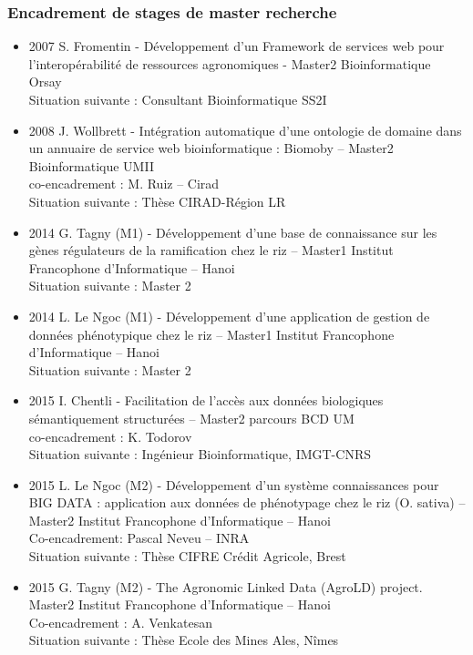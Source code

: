 
\subsubsection*{Encadrement de stages de master recherche}

\begin{itemize}
\item 2007 S. Fromentin - Développement d’un Framework de services web pour l’interopérabilité de ressources agronomiques - Master2 Bioinformatique Orsay\\
Situation suivante : Consultant Bioinformatique SS2I

\item 2008 J. Wollbrett - Intégration automatique d’une ontologie de domaine dans un annuaire de service web bioinformatique : Biomoby – Master2 Bioinformatique UMII\\
co-encadrement : M. Ruiz – Cirad\\
Situation suivante : Thèse CIRAD-Région LR

\item 2014 G. Tagny (M1) - Développement d’une base de connaissance sur les gènes régulateurs de la ramification chez le riz – Master1 Institut Francophone d’Informatique – Hanoi \\
Situation suivante : Master 2

\item 2014 L. Le Ngoc (M1) - Développement d’une application de gestion de données phénotypique chez le riz – Master1 Institut Francophone d’Informatique – Hanoi \\
Situation suivante : Master 2

\item 2015 I. Chentli - Facilitation de l'accès aux données biologiques sémantiquement structurées – Master2 parcours BCD UM \\
co-encadrement : K. Todorov \\
Situation suivante : Ingénieur Bioinformatique, IMGT-CNRS

\item 2015 L. Le Ngoc (M2) - Développement d’un système connaissances pour BIG DATA : application aux données de phénotypage chez le riz (O. sativa) – Master2 Institut Francophone d’Informatique – Hanoi \\
Co-encadrement: 	Pascal Neveu – INRA \\
Situation suivante : Thèse CIFRE Crédit Agricole, Brest

\item 2015 G. Tagny (M2) - The Agronomic Linked Data (AgroLD) project. Master2 Institut Francophone d’Informatique – Hanoi \\
Co-encadrement : A. Venkatesan \\
Situation suivante : Thèse Ecole des Mines Ales, Nîmes


\end{itemize}
